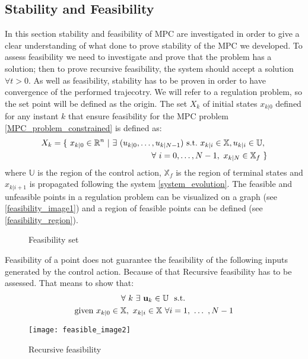 \subsection{Stability and Feasibility}
In this section stability and feasibility of MPC are investigated in order to give a clear understanding of what done to prove stability of the MPC we developed. To assess feasibility we need to investigate and prove that the problem has a solution; then to prove recursive feasibility, the system should accept a solution $\forall t>0$. As well as feasibility, stability has to be proven in order to have convergence of the performed trajecotry. We will refer to a regulation problem, so the set point will be defined as the origin.
The set $X_{k}$ of initial states $x_{k|0}$ defined for any instant $k$ that ensure feasibility for the MPC problem \ref{MPC_problem_constrained} is defined as:
\begin{equation}
	\begin{split}
		X_{k}=\lbrace\ x_{k|0}\in\mathbb{R}^n\ |\ \exists\  (u_{k|0}, \dots , u_{k|N-1})\ \textnormal{s.t.}\ x_{k|i} \in \mathbb{X}, u_{k|i} \in \mathbb{U},\ &  \\ 
		\forall\  i=0,\dots,N-1,\ x_{k|N} \in \mathbb{X}_f\ \rbrace& \\ 
	\end{split}
	\label{feasibility}
\end{equation}
where $\mathbb{U}$ is the region of the control action, $\mathbb{X}_f$ is the region of terminal states and $x_{k|i+1}$ is propagated following the system \ref{system_evolution}. The feasible and unfeasible points in a regulation problem can be visualized on a graph (see \ref{feasibility_image1}) and a region of feasible points can be defined (see \ref{feasibility_region}).

\begin{figure}%
\centering
{}%
\qquad
{}%
\caption{Feasibility set}
\end{figure}

Feasibility of a point does not guarantee the feasibility of the following inputs generated by the control action. Because of that Recursive feasibility has to be assessed. That means to show that:
\begin{equation}
\begin{split} 
&\ \ \ \ \ \ \ \ \ \forall\ k\ \exists\  \textbf{u}_k\in \mathbb{U}\ \  \textnormal{s.t. } \\ 
\textnormal{given } &x_{k|0} \in \mathbb{X}, \  x_{k|i} \in \mathbb{X}\  \forall i = 1,\  \dots\ , N-1   
\end{split}
\label{def_rec_feas}
\end{equation}
\begin{figure}[h!]
	\centering
	\texttt{[image: feasible\_image2]}
	\caption{Recursive feasibility}
	\label{feasible_image2}
\end{figure}

